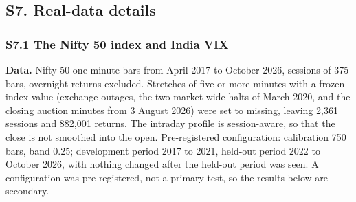 \documentclass[
]{article}
\begin{document}
\hypertarget{s7.-real-data-details}{%
\subsection{S7. Real-data details}\label{s7.-real-data-details}}

\hypertarget{s7.1-the-nifty-50-index-and-india-vix}{%
\subsubsection{S7.1 The Nifty 50 index and India
VIX}\label{s7.1-the-nifty-50-index-and-india-vix}}

\textbf{Data.} Nifty 50 one-minute bars from April 2017 to October 2026,
sessions of 375 bars, overnight returns excluded. Stretches of five or
more minutes with a frozen index value (exchange outages, the two
market-wide halts of March 2020, and the closing auction minutes from 3
August 2026) were set to missing, leaving 2,361 sessions and 882,001
returns. The intraday profile is session-aware, so that the close is not
smoothed into the open. Pre-registered configuration: calibration 750
bars, band 0.25; development period 2017 to 2021, held-out period 2022
to October 2026, with nothing changed after the held-out period was
seen. A configuration was pre-registered, not a primary test, so the
results below are secondary.
\end{document}
